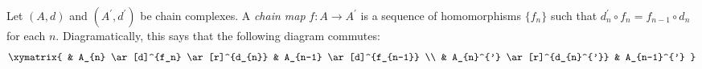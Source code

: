 \documentclass[12pt]{article}
\begin{document}
Let $(A,d)$ and $(A^{'},d^{'})$ be chain complexes. A \emph{chain map} $f:A \to A^{'}$ is a sequence of homomorphisms $\{f_n\}$ such that $d_{n}^{'} \circ f_{n} =  f_{n-1} \circ d_{n}$ for each $n$. Diagramatically, this says that the following diagram commutes: 
$$
\xymatrix{
& A_{n} \ar[d]^{f_n} \ar[r]^{d_{n}} & A_{n-1} \ar[d]^{f_{n-1}} \\
& A_{n}^{'} \ar[r]^{d_{n}^{'}} & A_{n-1}^{'}
}
$$
\end{document}
